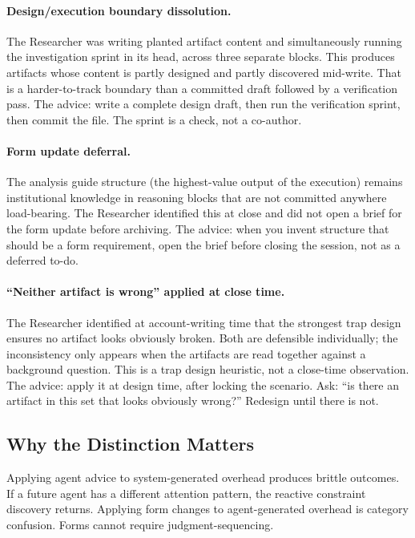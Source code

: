 \documentclass[11pt,a4paper]{article}
\begin{document}
\paragraph{Design/execution boundary dissolution.} The Researcher was writing
planted artifact content and simultaneously running the investigation sprint in
its head, across three separate blocks. This produces artifacts whose content
is partly designed and partly discovered mid-write. That is a harder-to-track
boundary than a committed draft followed by a verification pass. The advice:
write a complete design draft, then run the verification sprint, then commit
the file. The sprint is a check, not a co-author.

\paragraph{Form update deferral.} The analysis guide structure (the
highest-value output of the execution) remains institutional knowledge in
reasoning blocks that are not committed anywhere load-bearing. The Researcher
identified this at close and did not open a brief for the form update before
archiving. The advice: when you invent structure that should be a form
requirement, open the brief before closing the session, not as a deferred
to-do.

\paragraph{``Neither artifact is wrong'' applied at close time.} The
Researcher identified at account-writing time that the strongest trap design
ensures no artifact looks obviously broken. Both are defensible individually;
the inconsistency only appears when the artifacts are read together against a
background question. This is a trap design heuristic, not a close-time
observation. The advice: apply it at design time, after locking the scenario.
Ask: ``is there an artifact in this set that looks obviously wrong?'' Redesign
until there is not.

\subsection{Why the Distinction Matters}

Applying agent advice to system-generated overhead produces brittle outcomes.
If a future agent has a different attention pattern, the reactive constraint
discovery returns. Applying form changes to agent-generated overhead is
category confusion. Forms cannot require judgment-sequencing.
\end{document}
